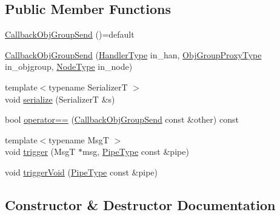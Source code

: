 \subsection*{Public Member Functions}
\begin{DoxyCompactItemize}
\item 
\hyperlink{structvt_1_1pipe_1_1callback_1_1_callback_obj_group_send_ad23abb2b17572d769a347984efe6441b}{Callback\+Obj\+Group\+Send} ()=default
\item 
\hyperlink{structvt_1_1pipe_1_1callback_1_1_callback_obj_group_send_a4ddc589bf578055a3e96b62be954c12e}{Callback\+Obj\+Group\+Send} (\hyperlink{namespacevt_af64846b57dfcaf104da3ef6967917573}{Handler\+Type} in\+\_\+han, \hyperlink{namespacevt_ad7cae989df485fccca57f0792a880a8e}{Obj\+Group\+Proxy\+Type} in\+\_\+objgroup, \hyperlink{namespacevt_a866da9d0efc19c0a1ce79e9e492f47e2}{Node\+Type} in\+\_\+node)
\item 
{\footnotesize template$<$typename SerializerT $>$ }\\void \hyperlink{structvt_1_1pipe_1_1callback_1_1_callback_obj_group_send_a703ca9f56b2d1927b098a5889326a758}{serialize} (SerializerT \&s)
\item 
bool \hyperlink{structvt_1_1pipe_1_1callback_1_1_callback_obj_group_send_a32e50947e4799023db35e63f80575c63}{operator==} (\hyperlink{structvt_1_1pipe_1_1callback_1_1_callback_obj_group_send}{Callback\+Obj\+Group\+Send} const \&other) const
\item 
{\footnotesize template$<$typename MsgT $>$ }\\void \hyperlink{structvt_1_1pipe_1_1callback_1_1_callback_obj_group_send_a40f0cd87224b51fdbfffacfe80bdde35}{trigger} (MsgT $\ast$msg, \hyperlink{namespacevt_ac9852acda74d1896f48f406cd72c7bd3}{Pipe\+Type} const \&pipe)
\item 
void \hyperlink{structvt_1_1pipe_1_1callback_1_1_callback_obj_group_send_a9c15cb84991c601f50eede9d41ef811c}{trigger\+Void} (\hyperlink{namespacevt_ac9852acda74d1896f48f406cd72c7bd3}{Pipe\+Type} const \&pipe)
\end{DoxyCompactItemize}


\subsection{Constructor \& Destructor Documentation}
\mbox{\label{structvt_1_1pipe_1_1callback_1_1_callback_obj_group_send_ad23abb2b17572d769a347984efe6441b}} 
